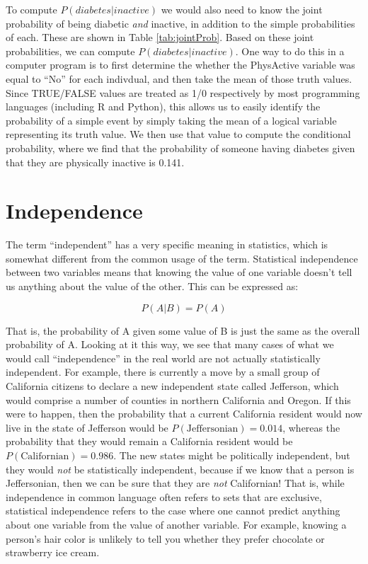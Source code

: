 \documentclass[12pt,]{book}
\theoremstyle{definition}
\theoremstyle{definition}
\theoremstyle{definition}
\theoremstyle{remark}
\begin{document}
To compute \(P(diabetes|inactive)\) we would also need to know the joint probability of being diabetic \emph{and} inactive, in addition to the simple probabilities of each. These are shown in Table \ref{tab:jointProb}.
Based on these joint probabilities, we can compute \(P(diabetes|inactive)\). One way to do this in a computer program is to first determine the whether the PhysActive variable was equal to ``No'' for each indivdual, and then take the mean of those truth values. Since TRUE/FALSE values are treated as 1/0 respectively by most programming languages (including R and Python), this allows us to easily identify the probability of a simple event by simply taking the mean of a logical variable representing its truth value. We then use that value to compute the conditional probability, where we find that the probability of someone having diabetes given that they are physically inactive is 0.141.

\hypertarget{independence}{%
\section{Independence}\label{independence}}

The term ``independent'' has a very specific meaning in statistics, which is somewhat different from the common usage of the term. Statistical independence between two variables means that knowing the value of one variable doesn't tell us anything about the value of the other. This can be expressed as:

\[
P(A|B) = P(A)
\]

That is, the probability of A given some value of B is just the same as the overall probability of A. Looking at it this way, we see that many cases of what we would call ``independence'' in the real world are not actually statistically independent. For example, there is currently a move by a small group of California citizens to declare a new independent state called Jefferson, which would comprise a number of counties in northern California and Oregon. If this were to happen, then the probability that a current California resident would now live in the state of Jefferson would be \(P(\text{Jeffersonian})=0.014\), whereas the probability that they would remain a California resident would be \(P(\text{Californian})=0.986\). The new states might be politically independent, but they would \emph{not} be statistically independent, because if we know that a person is Jeffersonian, then we can be sure that they are \emph{not} Californian! That is, while independence in common language often refers to sets that are exclusive, statistical independence refers to the case where one cannot predict anything about one variable from the value of another variable. For example, knowing a person's hair color is unlikely to tell you whether they prefer chocolate or strawberry ice cream.
\end{document}
